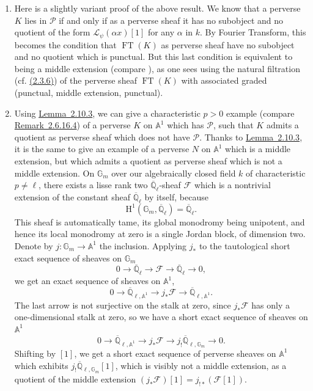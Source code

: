 \begin{enumerate}[label=(\arabic*)]
\item Here is a slightly variant proof of the above result. We know that a
perverse \(K\) lies in \(\mathcal{P}\) if and only if as a perverse sheaf it
has no subobject and no quotient of the form \(\mathcal{L}_\psi(\alpha x)[1]\)
for any \(\alpha\) in \(k\). By Fourier Transform, this becomes the condition
that \(\operatorname{FT}(K)\) as perverse sheaf have no subobject and no
quotient which is punctual. But this last condition is equivalent to being a
middle extension (compare \cite[2.9.1]{Ka-ESDE}), as one sees using the
natural filtration (cf. \hyperref[par:2.3.6]{(2.3.6)}) of the perverse sheaf \(\operatorname{FT}(K)\)
with associated graded (punctual, middle extension, punctual).
\item Using \hyperref[lem:2.10.3]{Lemma~2.10.3}, we can give a characteristic \(p>0\) example (compare
\hyperref[rem:2.6.16.4]{Remark~2.6.16.4}) of a perverse \(K\) on \(\mathbb{A}^1\) which has \(\mathcal{P}\),
such that \(K\) admits a quotient as perverse sheaf which does not have
\(\mathcal{P}\). Thanks to \hyperref[lem:2.10.3]{Lemma~2.10.3}, it is the same to give an example of a
perverse \(N\) on \(\mathbb{A}^1\) which is a middle extension, but which
admits a quotient as perverse sheaf which is not a middle extension. On
\(\mathbb{G}_m\) over our algebraically closed field \(k\) of characteristic
\(p\neq\ell\), there exists a lisse rank two
\(\overline{\mathbb{Q}}_\ell\)-sheaf \(\mathcal{F}\) which is a nontrivial
extension of the constant sheaf \(\overline{\mathbb{Q}}_\ell\) by itself,
because
\[
  \mathrm{H}^1(\mathbb{G}_m,\overline{\mathbb{Q}}_\ell)
  =
  \overline{\mathbb{Q}}_\ell.
\]
This sheaf is automatically tame, its global monodromy being unipotent, and
hence its local monodromy at zero is a single Jordan block, of dimension two.
Denote by \(j:\mathbb{G}_m\to\mathbb{A}^1\) the inclusion. Applying \(j_*\) to
the tautological short exact sequence of sheaves on \(\mathbb{G}_m\)
\[
  0\to\overline{\mathbb{Q}}_\ell\to\mathcal{F}\to
  \overline{\mathbb{Q}}_\ell\to 0,
\]
we get an exact sequence of sheaves on \(\mathbb{A}^1\),
\[
  0\to\overline{\mathbb{Q}}_{\ell,\mathbb{A}^1}
  \to j_*\mathcal{F}
  \to\overline{\mathbb{Q}}_{\ell,\mathbb{A}^1}.
\]
The last arrow is not surjective on the stalk at zero, since \(j_*\mathcal{F}\)
has only a one-dimensional stalk at zero, so we have a short exact sequence of
sheaves on \(\mathbb{A}^1\)
\[
  0\to\overline{\mathbb{Q}}_{\ell,\mathbb{A}^1}
  \to j_*\mathcal{F}
  \to j_!\overline{\mathbb{Q}}_{\ell,\mathbb{G}_m}
  \to 0.
\]
Shifting by \([1]\), we get a short exact sequence of perverse sheaves on
\(\mathbb{A}^1\) which exhibits
\(j_!\overline{\mathbb{Q}}_{\ell,\mathbb{G}_m}[1]\), which is visibly not a
middle extension, as a quotient of the middle extension
\((j_*\mathcal{F})[1]=j_{!*}(\mathcal{F}[1])\).
\end{enumerate}

